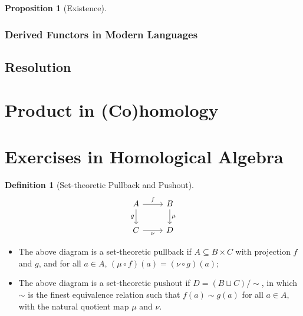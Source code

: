 \documentclass[10pt]{report}
\theoremstyle{definition}
\newtheorem{definition}{Definition}
\newtheorem{proposition}{Proposition}
\begin{document}
\begin{proposition}[Existence]
\end{proposition}

\subsubsection{Derived Functors in Modern Languages}

\subsection{Resolution}

\section{Product in (Co)homology}

\section{Exercises in Homological Algebra}
\begin{definition}[Set-theoretic Pullback and Pushout]
$$
\begin{tikzcd}
A \arrow[r, "f"] \arrow[d, "g"'] & B \arrow[d, "\mu"] \\
C \arrow[r, "\nu"']              & D
\end{tikzcd}
$$
\begin{itemize}
\item The above diagram is a set-theoretic pullback if $A\subseteq B\times C$ with projection $f$ and $g$, and for all $a\in A$, $(\mu\circ f)(a)=(\nu\circ g)(a)$;
\item The above diagram is a set-theoretic pushout if $D=(B\sqcup C)/\mathrm{\sim}$, in which $\sim$ is the finest equivalence relation such that $f(a)\sim g(a)$ for all $a\in A$, with the natural quotient map $\mu$ and $\nu$.
\end{itemize}
\end{definition}
\end{document}
